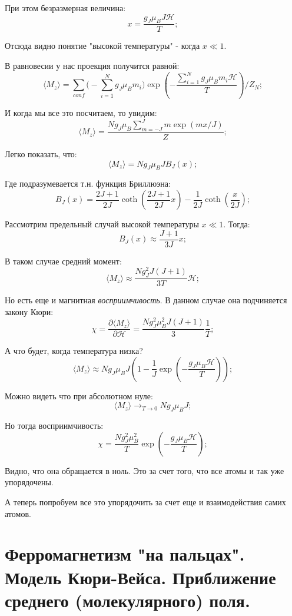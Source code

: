 \documentclass[a4paper, 14pt, russian]{article}
\newcommand{\be}{\begin{equation}}
\newcommand{\ee}{\end{equation}}
\newcommand{\pa}{\partial}
\begin{document}
	При этом безразмерная величина:
	\be
		\label{eq88}
		x = \frac{g_J \mu_B J \mathcal H}{T};
	\ee

	Отсюда видно понятие "высокой температуры" - когда $x \ll 1$.

	В равновесии у нас проекция получится равной:
	\be
		\langle M_z \rangle =  \sum_{conf} \big(-\sum_{i = 1}^N g_J \mu_B m_i\big)
			\exp(-\frac{\sum_{i=1}^N g_J \mu_B m_i \mathcal H}{T}) / Z_N;
	\ee

	И когда мы все это посчитаем, то увидим:
	\be
		\label{eq89}
		\langle M_z \rangle = \frac{Ng_J \mu_B \sum_{m=-J}^J m \exp(mx / J)}{Z};
	\ee

	Легко показать, что:
	\be
		\langle M_z \rangle = N g_J \mu_B J B_J(x);
	\ee

	Где подразумевается т.н. функция Бриллюэна:
	\be
		\label{eq90}
		B_J(x) = \frac{2J+1}{2J} \coth(\frac{2J+1}{2J} x) - \frac{1}{2J} \coth(\frac{x}{2J});
	\ee

	Рассмотрим предельный случай высокой температуры  $x \ll 1$. Тогда:
	\be
		B_J(x) \approx \frac{J+1}{3J} x;
	\ee

	В таком случае средний момент:
	\be
		\label{eq91}
		\langle M_z \rangle \approx \frac{N g_J^2 J(J+1)}{3T} \mathcal H;
	\ee


	Но есть еще и магнитная \textit{восприимчивость}. В данном случае
	она подчиняется закону Кюри:
	\be
		\chi = \frac{\pa \langle M_z \rangle}{\pa \mathcal H} = 
			\frac{Ng_J^2 \mu_B^2 J(J+1)}{3} \frac{1}{T};
	\ee

	А что будет, когда температура низка?
	\be
		\langle M_z \rangle \approx Ng_J \mu_B J \left(1 - \frac{1}{J}
			\exp(-\frac{g_J \mu_B \mathcal H}{T})\right);
	\ee

	Можно видеть что при абсолютном нуле:
	\be
		\label{eq92}
		\langle M_z \rangle \rightarrow_{T\rightarrow 0} Ng_J \mu_B J;
	\ee

	Но тогда восприимчивость:
	\be
		\chi = \frac{Ng_J^2 \mu_B^2}{T} \exp(-\frac{g_J \mu_B \mathcal H}{T});
	\ee

	Видно, что она обращается в ноль. Это за счет того, что
	все атомы и так уже упорядочены.

	А теперь попробуем все это упорядочить за счет еще и взаимодействия
	самих атомов.

	\section{Ферромагнетизм "на пальцах". Модель Кюри-Вейса. Приближение среднего (молекулярного) поля.}
\end{document}
